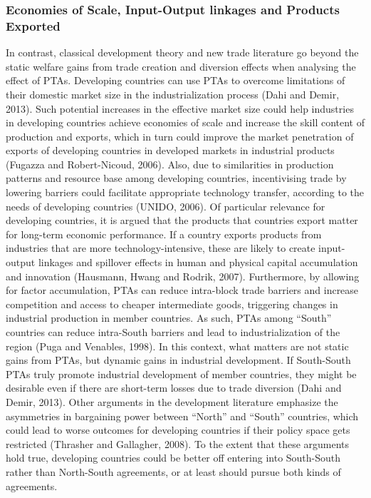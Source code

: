 \documentclass[12pt]{article}%
\begin{document}
\subsubsection{Economies of Scale, Input{-}Output linkages and Products Exported}%
\label{ssubsec:EconomiesofScale,Input{-}OutputlinkagesandProductsExported}%

%
In contrast, classical development theory and new trade literature go
beyond the static welfare gains from trade creation and diversion
effects when analysing the effect of PTAs. Developing countries can use
PTAs to overcome limitations of their domestic market size in the
industrialization process (Dahi and Demir, 2013). Such potential
increases in the effective market size could help industries in
developing countries achieve economies of scale and increase the skill
content of production and exports, which in turn could improve the
market penetration of exports of developing countries in developed
markets in industrial products (Fugazza and Robert-Nicoud, 2006). Also,
due to similarities in production patterns and resource base among
developing countries, incentivising trade by lowering barriers could
facilitate appropriate technology transfer, according to the needs of
developing countries (UNIDO, 2006). Of particular relevance for
developing countries, it is argued that the products that countries
export matter for long-term economic performance. If a country exports
products from industries that are more technology-intensive, these are
likely to create input-output linkages and spillover effects in human
and physical capital accumulation and innovation (Hausmann, Hwang and
Rodrik, 2007). Furthermore, by allowing for factor accumulation, PTAs
can reduce intra-block trade barriers and increase competition and
access to cheaper intermediate goods, triggering changes in industrial
production in member countries. As such, PTAs among ``South'' countries
can reduce intra-South barriers and lead to industrialization of the
region (Puga and Venables, 1998). In this context, what matters are not
static gains from PTAs, but dynamic gains in industrial development. If
South-South PTAs truly promote industrial development of member
countries, they might be desirable even if there are short-term losses
due to trade diversion (Dahi and Demir, 2013). Other arguments in the
development literature emphasize the asymmetries in bargaining power
between ``North'' and ``South'' countries, which could lead to worse
outcomes for developing countries if their policy space gets restricted
(Thrasher and Gallagher, 2008). To the extent that these arguments hold
true, developing countries could be better off entering into South-South
rather than North-South agreements, or at least should pursue both kinds
of agreements.
\end{document}
